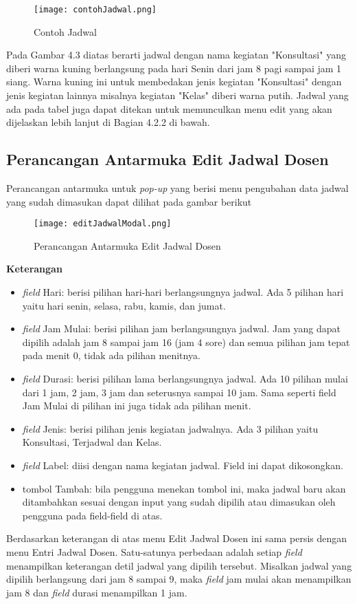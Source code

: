 \begin{enumerate}
		\begin{figure} [H]
			\centering  
			\texttt{[image: contohJadwal.png]}
			\caption[Contoh Jadwal]{Contoh Jadwal} 
			\label{fig:flow-chart-CodeIgniter} 
		\end{figure}
		Pada Gambar 4.3 diatas berarti jadwal dengan nama kegiatan "Konsultasi" yang diberi warna kuning berlangsung pada hari Senin dari jam 8 pagi sampai jam 1 siang. Warna kuning ini untuk membedakan jenis kegiatan "Konsultasi" dengan jenis kegiatan lainnya misalnya kegiatan "Kelas" diberi warna putih. Jadwal yang ada pada tabel juga dapat ditekan untuk memunculkan menu edit yang akan dijelaskan lebih lanjut di Bagian 4.2.2 di bawah.
\end{enumerate}
\subsection{Perancangan Antarmuka Edit Jadwal Dosen}
Perancangan antarmuka untuk \textit{pop-up} yang berisi menu pengubahan data jadwal yang sudah dimasukan dapat dilihat pada gambar berikut
\begin{figure} [H]
	\centering  
	\texttt{[image: editJadwalModal.png]}
	\caption[Perancangan Antarmuka Edit Jadwal Dosen]{Perancangan Antarmuka Edit Jadwal Dosen} 
	\label{fig:flow-chart-CodeIgniter} 
\end{figure}
\textbf{Keterangan}
\begin{itemize}
		\item \textit{field} Hari: berisi pilihan hari-hari berlangsungnya jadwal. Ada 5 pilihan hari yaitu hari senin, selasa, rabu, kamis, dan jumat.
		\item \textit{field} Jam Mulai: berisi pilihan jam berlangsungnya jadwal. Jam yang dapat dipilih adalah jam 8 sampai jam 16 (jam 4 sore) dan semua 		pilihan jam tepat pada menit 0, tidak ada pilihan menitnya.
		\item \textit{field} Durasi: berisi pilihan lama berlangsungnya jadwal. Ada 10 pilihan mulai dari 1 jam, 2 jam, 3 jam dan seterusnya sampai 10 			jam. Sama seperti field Jam Mulai di pilihan ini juga tidak ada pilihan menit.
		\item \textit{field} Jenis: berisi pilihan jenis kegiatan jadwalnya. Ada 3 pilihan yaitu Konsultasi, Terjadwal dan Kelas.
		\item \textit{field} Label: diisi dengan nama kegiatan jadwal. Field ini dapat dikosongkan.
		\item tombol Tambah: bila pengguna menekan tombol ini, maka jadwal baru akan ditambahkan sesuai dengan input yang sudah dipilih atau dimasukan oleh pengguna pada field-field di atas.
	\end{itemize}
Berdasarkan keterangan di atas menu Edit Jadwal Dosen ini sama persis dengan menu Entri Jadwal Dosen. Satu-satunya perbedaan adalah setiap \textit{field} menampilkan keterangan detil jadwal yang dipilih tersebut. Misalkan jadwal yang dipilih berlangsung dari jam 8 sampai 9, maka \textit{field} jam mulai akan menampilkan jam 8 dan \textit{field} durasi menampilkan 1 jam.

